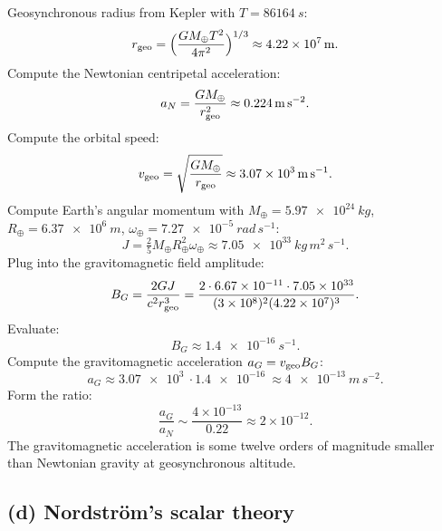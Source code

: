 \documentclass[11pt]{article}
\begin{document}
Geosynchronous radius from Kepler with $T=\SI{86164}{s}$:
\[
r_{\rm geo}=\Bigl(\frac{GM_{\oplus}T^{2}}{4\pi^{2}}\Bigr)^{1/3}\approx \SI{4.22e7}{m}.
\]
Compute the Newtonian centripetal acceleration:
\[
a_{N}=\frac{GM_{\oplus}}{r_{\rm geo}^{2}}\approx \SI{0.224}{m\,s^{-2}}.
\]
Compute the orbital speed:
\[
v_{\rm geo}=\sqrt{\frac{GM_{\oplus}}{r_{\rm geo}}}\approx \SI{3.07e3}{m\,s^{-1}}.
\]
Compute Earth's angular momentum with $M_{\oplus}=\SI{5.97e24}{kg}$, $R_{\oplus}=\SI{6.37e6}{m}$, $\omega_{\oplus}=\SI{7.27e-5}{rad\,s^{-1}}$:
\[
J=\tfrac{2}{5}M_{\oplus}R_{\oplus}^{2}\omega_{\oplus}\approx \SI{7.05e33}{kg\,m^{2}\,s^{-1}}.
\]
Plug into the gravitomagnetic field amplitude:
\[
B_{G}=\frac{2GJ}{c^{2}r_{\rm geo}^{3}}=\frac{2\cdot \SI{6.67e-11}{}\cdot \SI{7.05e33}{}}{(\SI{3e8}{})^{2}(\SI{4.22e7}{})^{3}}.
\]
Evaluate:
\[
B_{G}\approx \SI{1.4e-16}{s^{-1}}.
\]
Compute the gravitomagnetic acceleration $a_{G}=v_{\rm geo}B_{G}$:
\[
a_{G}\approx \SI{3.07e3}{}\cdot \SI{1.4e-16}{}\approx \SI{4e-13}{m\,s^{-2}}.
\]
Form the ratio:
\[
\boxed{\;\frac{a_{G}}{a_{N}}\sim \frac{4\times 10^{-13}}{0.22}\approx 2\times 10^{-12}.\;}
\]
The gravitomagnetic acceleration is some twelve orders of magnitude smaller than Newtonian gravity at geosynchronous altitude.

\subsection*{(d) Nordstr\"om's scalar theory}
\end{document}
